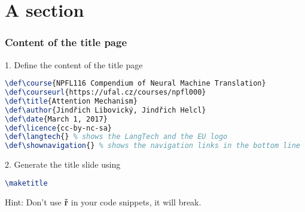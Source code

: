 \documentclass[handout,aspectratio=169]{beamer}
\def\course{NPFL000 Name of the course}
\def\courseurl{https://ufal.cz/courses/npfl000}
\def\title{\LaTeX~template for LangTech courses taught at ÚFAL}
\def\author{Jindřich Libovický}
\def\date{September 7, 2018}
\def\licence{cc-by-nc-sa}
\def\langtech{}
\def\shownavigation{}
\begin{document}
\maketitle


\section{A section}

\begin{frame}[fragile]
    \frametitle{Content of the title page}

1. Define the content of the title page
    \begin{lstlisting}[language=TeX]
\def\course{NPFL116 Compendium of Neural Machine Translation}
\def\courseurl{https://ufal.cz/courses/npfl000}
\def\title{Attention Mechanism}
\def\author{Jindřich Libovický, Jindřich Helcl}
\def\date{March 1, 2017}
\def\licence{cc-by-nc-sa}
\def\langtech{} % shows the LangTech and the EU logo
\def\shownavigation{} % shows the navigation links in the bottom line
\end{lstlisting}

2. Generate the title slide using
\begin{lstlisting}[language=TeX]
\maketitle
\end{lstlisting}

    \vspace{5pt}

    Hint: Don't use \textbf{ř} in your code snippets, it will break.

\end{frame}

\end{document}
